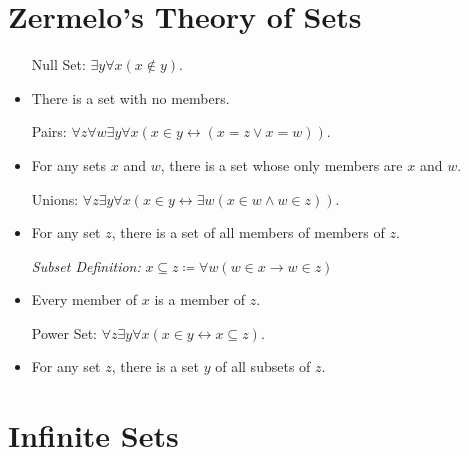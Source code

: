 \documentclass[a4paper, 11pt]{article} %
\begin{document}
\section*{Zermelo's Theory of Sets}

  \begin{itemize}
    \item[\sc Null Set:] $\exists y \forall x (x \notin y)$.
      \item There is a set with no members.
    \item[\sc Pairs:] $\forall z \forall w \exists y \forall x (x \in y \leftrightarrow (x = z \vee x = w))$.
      \item For any sets $x$ and $w$, there is a set whose only members are $x$ and $w$. 
    \item[\sc Unions:] $\forall z \exists y \forall x (x \in y \leftrightarrow \exists w (x \in w \wedge w \in z))$.
      \item For any set $z$, there is a set of all members of members of $z$. 
    \item[\it Subset Definition:] $x \subseteq z \coloneq \forall w(w \in x \rightarrow w \in z)$
      \item Every member of $x$ is a member of $z$. 
    \item[\sc Power Set:] $\forall z \exists y \forall x (x \in y \leftrightarrow x \subseteq z)$.
      \item For any set $z$, there is a set $y$ of all subsets of $z$. 
  \end{itemize}




\section*{Infinite Sets}
\end{document}

